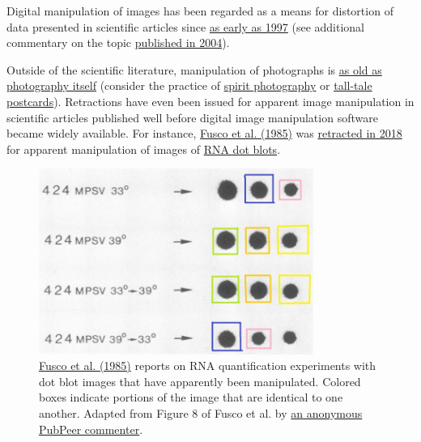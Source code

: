 \documentclass[letterpaper, 12pt]{article}
\begin{document}
Digital manipulation of images has been regarded as a means for distortion of data presented in scientific articles since \href{https://doi.org/10.1002/(SICI)1096-9896(199711)183:3%3C253::AID-PATH927%3E3.0.CO;2-P}{as early as 1997} (see additional commentary on the topic \href{https://doi.org/10.1083/jcb.200406019}{published in 2004}).

Outside of the scientific literature, manipulation of photographs is \href{https://iisjoa.org/sites/default/files/iisjoa/2017/PDF/11.%20Jitendra%20Sharma%20&%20Rohita%20Sharma.pdf}{as old as photography itself} (consider the practice of \href{https://en.wikipedia.org/wiki/Spirit_photography}{spirit photography} or \href{https://en.wikipedia.org/wiki/Exaggeration_postcard}{tall-tale postcards}). Retractions have even been issued for apparent image manipulation in scientific articles published well before digital image manipulation software became widely available. For instance, \href{https://doi.org/10.1128/jvi.56.1.284-292.1985}{Fusco et al. (1985)} was \href{https://doi.org/10.1128/jvi.02169-17}{retracted in 2018} for apparent manipulation of images of \href{https://doi.org/10.1093/nar/7.6.1541}{RNA dot blots}.

\begin{figure}[h!tbp]
    \centering
    \includegraphics[width=0.8\textwidth]{img/responses/imgur-ESa5N4V_scaled.jpg}
    \caption*{\href{https://doi.org/10.1128/jvi.56.1.284-292.1985}{Fusco et al. (1985)} reports on RNA quantification experiments with dot blot images that have apparently been manipulated. Colored boxes indicate portions of the image that are identical to one another. Adapted from Figure 8 of Fusco et al. by \href{https://pubpeer.com/publications/67130CFDA6D3D4F59D463598ACE835\#3}{an anonymous PubPeer commenter}.}
\end{figure}
\end{document}
